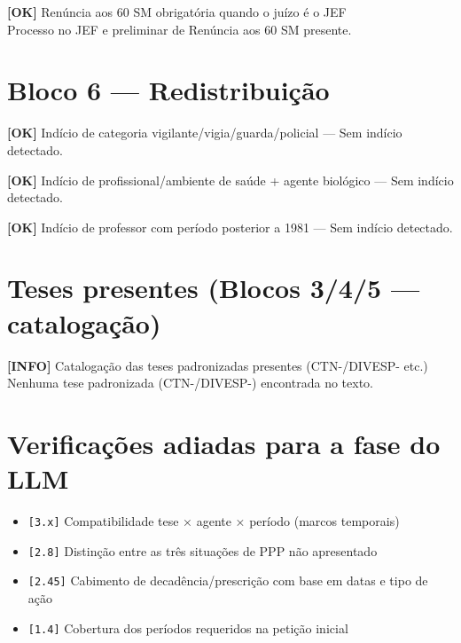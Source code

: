 \documentclass[12pt,a4paper]{article}
\newcommand{\statusOK}[1]{\textcolor{corOK}{\textbf{[OK]}} #1}
\newcommand{\statusINFO}[1]{\textcolor{corINFO}{\textbf{[INFO]}} #1}
\begin{document}
\statusOK{Renúncia aos 60 SM obrigatória quando o juízo é o JEF}\\
Processo no JEF e preliminar de Renúncia aos 60 SM presente.

\section{Bloco 6 --- Redistribuição}

\statusOK{Indício de categoria vigilante/vigia/guarda/policial} --- Sem indício detectado.

\medskip
\statusOK{Indício de profissional/ambiente de saúde + agente biológico} --- Sem indício detectado.

\medskip
\statusOK{Indício de professor com período posterior a 1981} --- Sem indício detectado.

\section{Teses presentes (Blocos 3/4/5 --- catalogação)}

\statusINFO{Catalogação das teses padronizadas presentes (CTN-/DIVESP- etc.)}\\
Nenhuma tese padronizada (CTN-/DIVESP-) encontrada no texto.

\section{Verificações adiadas para a fase do LLM}

\begin{itemize}
  \item \texttt{[3.x]} Compatibilidade tese × agente × período (marcos temporais)
  \item \texttt{[2.8]} Distinção entre as três situações de PPP não apresentado
  \item \texttt{[2.45]} Cabimento de decadência/prescrição com base em datas e tipo de ação
  \item \texttt{[1.4]} Cobertura dos períodos requeridos na petição inicial
\end{itemize}
\end{document}
